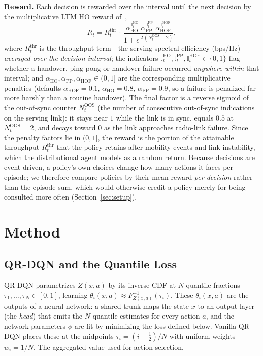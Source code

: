 \documentclass[conference]{IEEEtran}
\begin{document}
\textbf{Reward.} Each decision is rewarded over the interval until the next
decision by the multiplicative LTM HO reward of~\cite{cmab_ho},
\begin{equation}
R_t = R^{\mathrm{thr}}_t \,\cdot\,
      \frac{\alpha_{\mathrm{HO}}^{\,\mathbb{I}^{\mathrm{HO}}_t}\;
            \alpha_{\mathrm{PP}}^{\,\mathbb{I}^{\mathrm{PP}}_t}\;
            \alpha_{\mathrm{HOF}}^{\,\mathbb{I}^{\mathrm{HOF}}_t}}
           {1 + e^{\,2\,(N^{\mathrm{OOS}}_t - 2)}},
\label{eq:reward}
\end{equation}
where $R^{\mathrm{thr}}_t$ is the throughput term---the serving spectral
efficiency (bps/Hz) \emph{averaged over the decision interval}; the indicators
$\mathbb{I}^{\mathrm{HO}}_t,\mathbb{I}^{\mathrm{PP}}_t,\mathbb{I}^{\mathrm{HOF}}_t\in\{0,1\}$
flag whether a handover, ping-pong or handover failure occurred \emph{anywhere
within} that interval; and
$\alpha_{\mathrm{HO}},\alpha_{\mathrm{PP}},\alpha_{\mathrm{HOF}}\in(0,1]$ are the
corresponding multiplicative penalties (defaults $\alpha_{\mathrm{HOF}}{=}0.1$,
$\alpha_{\mathrm{HO}}{=}0.8$, $\alpha_{\mathrm{PP}}{=}0.9$, so a failure is
penalized far more harshly than a routine handover). The final factor is a
reverse sigmoid of the out-of-sync counter $N^{\mathrm{OOS}}_t$ (the number of
consecutive out-of-sync indications on the serving link): it stays near $1$
while the link is in sync, equals $0.5$ at $N^{\mathrm{OOS}}_t{=}2$, and decays
toward $0$ as the link approaches radio-link failure.
Since the penalty factors lie in $(0,1]$, the reward is the portion of the
attainable throughput $R^{\mathrm{thr}}_t$ that the policy retains after mobility
events and link instability, which the distributional agent models as a random
return.
Because decisions are event-driven, a policy's own choices change how many actions it
faces per episode; we therefore compare policies by their mean reward
\emph{per decision} rather than the episode sum, which would otherwise credit a
policy merely for being consulted more often (Section~\ref{sec:setup}).


\section{Method}
\label{sec:method}

\subsection{QR-DQN and the Quantile Loss}
QR-DQN parametrizes $Z(x,a)$ by its inverse CDF at $N$ quantile fractions
$\tau_1,\dots,\tau_N\in[0,1]$, learning
$\theta_i(x,a)\approx F^{-1}_{Z(x,a)}(\tau_i)$.
These $\theta_i(x,a)$ are the
outputs of a neural network: a shared trunk maps the state $x$ to an output
layer (the \emph{head}) that emits the $N$ quantile estimates for every action
$a$, and the network parameters $\phi$ are fit by
minimizing the loss defined below.
Vanilla QR-DQN places these at
the midpoints $\tau_i=(i-\tfrac12)/N$ with uniform weights $w_i=1/N$. The
aggregated value used for action selection,
\end{document}

